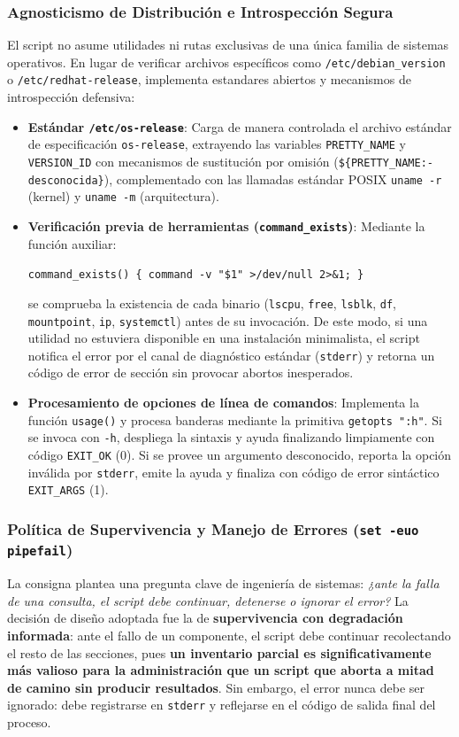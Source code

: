 \documentclass[11pt,a4paper]{article}
\begin{document}
\subsubsection{Agnosticismo de Distribución e Introspección Segura}
El script no asume utilidades ni rutas exclusivas de una única familia de sistemas operativos. En lugar de verificar archivos específicos como \texttt{/etc/debian\_version} o \texttt{/etc/redhat-release}, implementa estandares abiertos y mecanismos de introspección defensiva:
\begin{itemize}[leftmargin=*]
    \item \textbf{Estándar \texttt{/etc/os-release}}: Carga de manera controlada el archivo estándar de especificación \texttt{os-release}, extrayendo las variables \texttt{PRETTY\_NAME} y \texttt{VERSION\_ID} con mecanismos de sustitución por omisión (\texttt{\$\{PRETTY\_NAME:-desconocida\}}), complementado con las llamadas estándar POSIX \texttt{uname -r} (kernel) y \texttt{uname -m} (arquitectura).
    \item \textbf{Verificación previa de herramientas (\texttt{command\_exists})}: Mediante la función auxiliar:
    \begin{center}
    \texttt{command\_exists() \{ command -v "\$1" >/dev/null 2>\&1; \}}
    \end{center}
    se comprueba la existencia de cada binario (\texttt{lscpu}, \texttt{free}, \texttt{lsblk}, \texttt{df}, \texttt{mountpoint}, \texttt{ip}, \texttt{systemctl}) antes de su invocación. De este modo, si una utilidad no estuviera disponible en una instalación minimalista, el script notifica el error por el canal de diagnóstico estándar (\texttt{stderr}) y retorna un código de error de sección sin provocar abortos inesperados.
    \item \textbf{Procesamiento de opciones de línea de comandos}: Implementa la función \texttt{usage()} y procesa banderas mediante la primitiva \texttt{getopts ":h"}. Si se invoca con \texttt{-h}, despliega la sintaxis y ayuda finalizando limpiamente con código \texttt{EXIT\_OK} (0). Si se provee un argumento desconocido, reporta la opción inválida por \texttt{stderr}, emite la ayuda y finaliza con código de error sintáctico \texttt{EXIT\_ARGS} (1).
\end{itemize}

\subsubsection{Política de Supervivencia y Manejo de Errores (\texttt{set -euo pipefail})}
La consigna plantea una pregunta clave de ingeniería de sistemas: \textit{¿ante la falla de una consulta, el script debe continuar, detenerse o ignorar el error?}
La decisión de diseño adoptada fue la de \textbf{supervivencia con degradación informada}: ante el fallo de un componente, el script debe continuar recolectando el resto de las secciones, pues \textbf{un inventario parcial es significativamente más valioso para la administración que un script que aborta a mitad de camino sin producir resultados}. Sin embargo, el error nunca debe ser ignorado: debe registrarse en \texttt{stderr} y reflejarse en el código de salida final del proceso.
\end{document}
